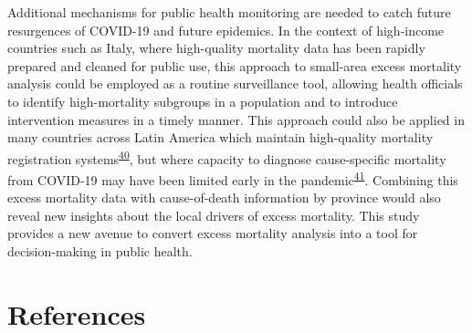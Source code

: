 \documentclass[
]{article}
\begin{document}
Additional mechanisms for public health monitoring are needed to catch future resurgences of COVID-19 and future epidemics. In the context of high-income countries such as Italy, where high-quality mortality data has been rapidly prepared and cleaned for public use, this approach to small-area excess mortality analysis could be employed as a routine surveillance tool, allowing health officials to identify high-mortality subgroups in a population and to introduce intervention measures in a timely manner. This approach could also be applied in many countries across Latin America which maintain high-quality mortality registration systems\textsuperscript{\protect\hyperlink{ref-Mikkelsen2015}{40}}⁠, but where capacity to diagnose cause-specific mortality from COVID-19 may have been limited early in the pandemic\textsuperscript{\protect\hyperlink{ref-LeonCabrera2020}{41}}⁠. Combining this excess mortality data with cause-of-death information by province would also reveal new insights about the local drivers of excess mortality. This study provides a new avenue to convert excess mortality analysis into a tool for decision-making in public health.

\hypertarget{references}{%
\section{References}\label{references}}
\end{document}

